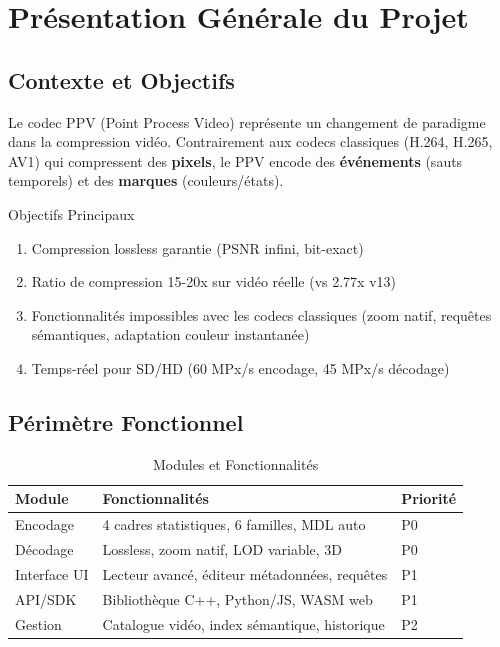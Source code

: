 \documentclass[12pt,a4paper]{article}
\begin{document}
	\tableofcontents
	\newpage
	
	\section{Présentation Générale du Projet}
	\label{sec:presentation}
	
	\subsection{Contexte et Objectifs}
	\label{subsec:contexte}
	
	Le codec PPV (Point Process Video) représente un changement de paradigme dans la compression vidéo. Contrairement aux codecs classiques (H.264, H.265, AV1) qui compressent des \textbf{pixels}, le PPV encode des \textbf{événements} (sauts temporels) et des \textbf{marques} (couleurs/états).
	
	\begin{infobox}{Objectifs Principaux}
		\begin{enumerate}
			\item Compression lossless garantie (PSNR infini, bit-exact)
			\item Ratio de compression 15-20x sur vidéo réelle (vs 2.77x v13)
			\item Fonctionnalités impossibles avec les codecs classiques (zoom natif, requêtes sémantiques, adaptation couleur instantanée)
			\item Temps-réel pour SD/HD (60 MPx/s encodage, 45 MPx/s décodage)
		\end{enumerate}
	\end{infobox}
	
	\subsection{Périmètre Fonctionnel}
	\label{subsec:perimetre}
	
	\begin{table}[h]
		\centering
		\caption{Modules et Fonctionnalités}
		\label{tab:modules}
		\begin{tabular}{@{}lll@{}}
			\toprule
			\textbf{Module} & \textbf{Fonctionnalités} & \textbf{Priorité} \\
			\midrule
			Encodage & 4 cadres statistiques, 6 familles, MDL auto & P0 \\
			Décodage & Lossless, zoom natif, LOD variable, 3D & P0 \\
			Interface UI & Lecteur avancé, éditeur métadonnées, requêtes & P1 \\
			API/SDK & Bibliothèque C++, Python/JS, WASM web & P1 \\
			Gestion & Catalogue vidéo, index sémantique, historique & P2 \\
			\bottomrule
		\end{tabular}
	\end{table}
	
\end{document}
